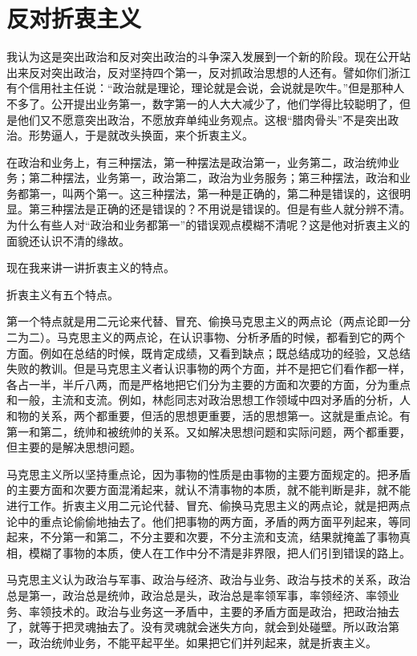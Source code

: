 \section[反对折衷主义（一九六五年十二月二日）]{反对折衷主义}


我认为这是突出政治和反对突出政治的斗争深入发展到一个新的阶段。现在公开站出来反对突出政治，反对坚持四个第一，反对抓政治思想的人还有。譬如你们浙江有个信用社主任说：“政治就是理论，理论就是会说，会说就是吹牛。”但是那种人不多了。公开提出业务第一，数字第一的人大大减少了，他们学得比较聪明了，但是他们又不愿意突出政治，不愿放弃单纯业务观点。这根“腊肉骨头”不是突出政治。形势逼人，于是就改头换面，来个折衷主义。

在政治和业务上，有三种摆法，第一种摆法是政治第一，业务第二，政治统帅业务；第二种摆法，业务第一，政治第二，政治为业务服务；第三种摆法，政治和业务都第一，叫两个第一。这三种摆法，第一种是正确的，第二种是错误的，这很明显。第三种摆法是正确的还是错误的？不用说是错误的。但是有些人就分辨不清。为什么有些人对“政治和业务都第一”的错误观点模糊不清呢？这是他对折衷主义的面貌还认识不清的缘故。

现在我来讲一讲折衷主义的特点。

折衷主义有五个特点。

第一个特点就是用二元论来代替、冒充、偷换马克思主义的两点论（两点论即一分二为二）。马克思主义的两点论，在认识事物、分析矛盾的时候，都看到它的两个方面。例如在总结的时候，既肯定成绩，又看到缺点；既总结成功的经验，又总结失败的教训。但是马克思主义者认识事物的两个方面，并不是把它们看作都一样，各占一半，半斤八两，而是严格地把它们分为主要的方面和次要的方面，分为重点和一般，主流和支流。例如，林彪同志对政治思想工作领域中四对矛盾的分析，人和物的关系，两个都重要，但活的思想更重要，活的思想第一。这就是重点论。有第一和第二，统帅和被统帅的关系。又如解决思想问题和实际问题，两个都重要，但主要的是解决思想问题。

马克思主义所以坚持重点论，因为事物的性质是由事物的主要方面规定的。把矛盾的主要方面和次要方面混淆起来，就认不清事物的本质，就不能判断是非，就不能进行工作。折衷主义用二元论代替、冒充、偷换马克思主义的两点论，就是把两点论中的重点论偷偷地抽去了。他们把事物的两方面，矛盾的两方面平列起来，等同起来，不分第一和第二，不分主要和次要，不分主流和支流，结果就掩盖了事物真相，模糊了事物的本质，使人在工作中分不清是非界限，把人们引到错误的路上。

马克思主义认为政治与军事、政治与经济、政治与业务、政治与技术的关系，政治总是第一，政治总是统帅，政治总是头，政治总是率领军事，率领经济、率领业务、率领技术的。政治与业务这一矛盾中，主要的矛盾方面是政治，把政治抽去了，就等于把灵魂抽去了。没有灵魂就会迷失方向，就会到处碰壁。所以政治第一，政治统帅业务，不能平起平坐。如果把它们并列起来，就是折衷主义。

